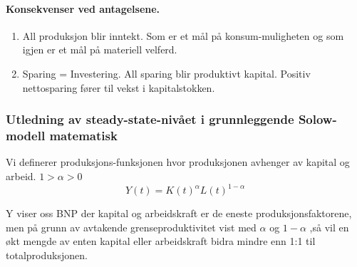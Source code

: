 \documentclass[
  12pt,
  a4paper,
  DIV=11,
  numbers=noendperiod]{scrartcl}
\let\oldparagraph\paragraph
\renewcommand{\paragraph}[1]{\oldparagraph{#1}\mbox{}}
\begin{document}
\paragraph{Konsekvenser ved
antagelsene.}\label{konsekvenser-ved-antagelsene.}

\begin{enumerate}
\def\labelenumi{\arabic{enumi}.}
\item
  All produksjon blir inntekt. Som er et mål på konsum-muligheten og som
  igjen er et mål på materiell velferd.
\item
  Sparing = Investering. All sparing blir produktivt kapital. Positiv
  nettosparing fører til vekst i kapitalstokken.
\end{enumerate}

\clearpage

\subsubsection{Utledning av steady-state-nivået i grunnleggende
Solow-modell
matematisk}\label{utledning-av-steady-state-nivuxe5et-i-grunnleggende-solow-modell-matematisk}

Vi definerer produksjons-funksjonen hvor produksjonen avhenger av
kapital og arbeid. \(1 >\alpha > 0\)
\[ Y(t) = K(t)^\alpha L(t)^{1-\alpha}\]

Y viser oss BNP der kapital og arbeidskraft er de eneste
produksjonsfaktorene, men på grunn av avtakende grenseproduktivitet vist
med \(\alpha\) og \(1-\alpha\) ,så vil en økt mengde av enten kapital
eller arbeidskraft bidra mindre enn 1:1 til totalproduksjonen.

\end{document}
